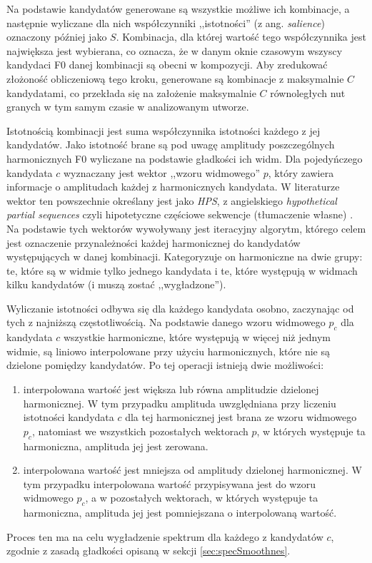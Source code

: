 \documentclass[12pt,a4paper,twoside]{mwart}
\begin{document}
Na podstawie kandydatów generowane są wszystkie możliwe ich kombinacje, a następnie wyliczane dla nich współczynniki ,,istotności'' (z ang. \textit{salience}) oznaczony później jako $S$. Kombinacja, dla której wartość tego współczynnika jest największa jest wybierana, co oznacza, że w danym oknie czasowym wszyscy kandydaci F0 danej kombinacji są obecni w kompozycji. Aby zredukować złożoność obliczeniową tego kroku, generowane są kombinacje z maksymalnie $C$ kandydatami, co przekłada się na założenie maksymalnie $C$ równoległych nut granych w tym samym czasie w analizowanym utworze.

Istotnością kombinacji jest suma współczynnika istotności każdego z jej kandydatów. Jako istotność brane są pod uwagę amplitudy poszczególnych harmonicznych F0 wyliczane na podstawie gładkości ich widm. Dla pojedyńczego kandydata $c$ wyznaczany jest wektor ,,wzoru widmowego'' $p$, który zawiera informacje o amplitudach każdej z harmonicznych kandydata. W literaturze wektor ten powszechnie określany jest jako \textit{HPS}, z angielskiego \textit{hypothetical partial sequences} czyli hipotetyczne częściowe sekwencje (tłumaczenie własne) 
\cite[1118]{Transcription:Yeh:JointEvaluationF0:2}
. Na podstawie tych wektorów wywoływany jest iteracyjny algorytm, którego celem jest oznaczenie przynależności każdej harmonicznej do kandydatów występujących w danej kombinacji. Kategoryzuje on harmoniczne na dwie grupy: te, które są w widmie tylko jednego kandydata i te, które występują w widmach kilku kandydatów (i muszą zostać ,,wygładzone'').

Wyliczanie istotności odbywa się dla każdego kandydata osobno, zaczynając od tych z najniższą częstotliwością. Na podstawie danego wzoru widmowego $p_c$ dla kandydata $c$ wszystkie harmoniczne, które występują w więcej niż jednym widmie, są liniowo interpolowane przy użyciu harmonicznych, które nie są dzielone pomiędzy kandydatów. Po tej operacji istnieją dwie możliwości:
\begin{enumerate}
\item interpolowana wartość jest większa lub równa amplitudzie dzielonej harmonicznej. W tym przypadku amplituda uwzględniana przy liczeniu istotności kandydata $c$ dla tej harmonicznej jest brana ze wzoru widmowego $p_c$, natomiast we wszystkich pozostałych wektorach $p$, w których występuje ta harmoniczna, amplituda jej jest zerowana.
\item interpolowana wartość jest mniejsza od amplitudy dzielonej harmonicznej. W tym przypadku interpolowana wartość przypisywana jest do wzoru widmowego $p_c$, a w pozostałych wektorach, w których występuje ta harmoniczna, amplituda jej jest pomniejszana o interpolowaną wartość.
\end{enumerate}
Proces ten ma na celu wygładzenie spektrum dla każdego z kandydatów $c$, zgodnie z zasadą gładkości opisaną w sekcji \ref{sec:specSmoothnes}.
\end{document}

